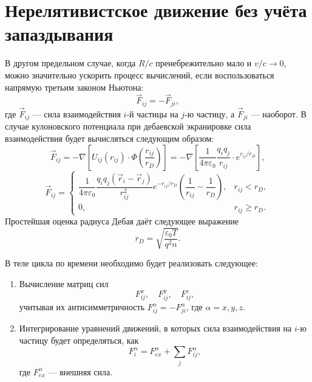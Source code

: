 \section{Нерелятивистское движение без учёта запаздывания}

В другом предельном случае, когда $R/c$ пренебрежительно мало и $v/c \to 0$, можно значительно ускорить процесс вычислений, если воспользоваться напрямую третьим законом Ньютона:
\begin{equation}
\vec{F}_{ij} = - \vec{F}_{ji},
\end{equation}
где $\vec{F}_{ij}$ --- сила взаимодействия $i$-й частицы на $j$-ю частицу, а $\vec{F}_{ji}$ --- наоборот.  В случае кулоновского потенциала при дебаевской экранировке сила взаимодействия будет вычисляться следующим образом:
\begin{equation*}
	\vec{F}_{ij} = - \nabla \left[U_{ij} (r_{ij}) \cdot \Phi \left( \frac{r_{ij}}{r_D} \right)\right] = - \nabla \left[ \frac{1}{4 \pi \varepsilon_0} \frac{q_i q_j}{r_{ij}} \cdot e^{r_{ij}/r_D} \right],
\end{equation*}
\begin{equation}
	\vec{F}_{ij} = 
	\begin{cases}
		\dfrac{1}{4 \pi \varepsilon_0} \dfrac{q_iq_j \left( \vec{r}_i - \vec{r}_j \right)}{r_{ij}^2} e^{-r_{ij}/r_D} \left( \dfrac{1}{r_{ij}} - \dfrac{1}{r_D} \right), & r_{ij} < r_D, \\
		0, & r_{ij} \geq r_D.
	\end{cases}
	\label{eq:force_with_debai}
\end{equation}
Простейшая оценка радиуса Дебая даёт следующее выражение
\begin{equation}
	r_D = \sqrt{\frac{\varepsilon_0 T}{q^2n}}.
	\label{eq:debai_analitic}
\end{equation}

В теле цикла по времени необходимо будет реализовать следующее:
\begin{enumerate}
\item Вычисление матриц сил
\begin{equation}
F^x_{ij}, \quad F^y_{ij}, \quad F^z_{ij},
\end{equation}
учитывая их антисимметричность $F^{\alpha}_{ij} = - F^{\alpha}_{ji}$, где $\alpha = x,y,z$.
\item Интегрирование уравнений движений, в которых сила взаимодействия на $i$-ю частицу будет определяться, как
\begin{equation}
F^{\alpha}_i = F^{\alpha}_{ex} + \sum\limits_{j} F^{\alpha}_{ij},
\end{equation}
где $F^{\alpha}_{ex}$ --- внешняя сила.
\end{enumerate}

